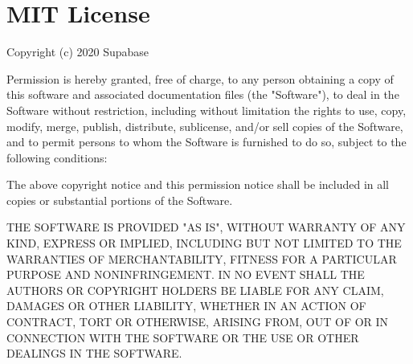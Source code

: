 \chapter{MIT License}
\hypertarget{md_node__modules_2_0dsupabase_2realtime-js_2_l_i_c_e_n_s_e}{}\label{md_node__modules_2_0dsupabase_2realtime-js_2_l_i_c_e_n_s_e}
\label{md_node__modules_2_0dsupabase_2realtime-js_2_l_i_c_e_n_s_e_autotoc_md6114}%
%


Copyright (c) 2020 Supabase

Permission is hereby granted, free of charge, to any person obtaining a copy of this software and associated documentation files (the "{}\+Software"{}), to deal in the Software without restriction, including without limitation the rights to use, copy, modify, merge, publish, distribute, sublicense, and/or sell copies of the Software, and to permit persons to whom the Software is furnished to do so, subject to the following conditions\+:

The above copyright notice and this permission notice shall be included in all copies or substantial portions of the Software.

THE SOFTWARE IS PROVIDED "{}\+AS IS"{}, WITHOUT WARRANTY OF ANY KIND, EXPRESS OR IMPLIED, INCLUDING BUT NOT LIMITED TO THE WARRANTIES OF MERCHANTABILITY, FITNESS FOR A PARTICULAR PURPOSE AND NONINFRINGEMENT. IN NO EVENT SHALL THE AUTHORS OR COPYRIGHT HOLDERS BE LIABLE FOR ANY CLAIM, DAMAGES OR OTHER LIABILITY, WHETHER IN AN ACTION OF CONTRACT, TORT OR OTHERWISE, ARISING FROM, OUT OF OR IN CONNECTION WITH THE SOFTWARE OR THE USE OR OTHER DEALINGS IN THE SOFTWARE. 